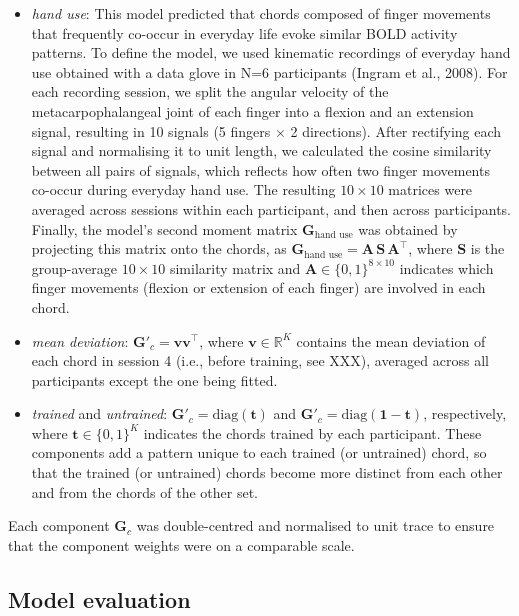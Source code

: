 \documentclass{article}
\begin{document}
\begin{itemize}
    \item \textit{hand use}: This model predicted that chords composed of finger movements that frequently co-occur in everyday life evoke similar BOLD activity patterns. To define the model, we used kinematic recordings of everyday hand use obtained with a data glove in N=6 participants (Ingram et al., 2008). For each recording session, we split the angular velocity of the metacarpophalangeal joint of each finger into a flexion and an extension signal, resulting in 10 signals (5 fingers $\times$ 2 directions). After rectifying each signal and normalising it to unit length, we calculated the cosine similarity between all pairs of signals, which reflects how often two finger movements co-occur during everyday hand use. The resulting $10 \times 10$ matrices were averaged across sessions within each participant, and then across participants. Finally, the model's second moment matrix $\mathbf{G}_{\text{hand use}}$ was obtained by projecting this matrix onto the chords, as $\mathbf{G}_{\text{hand use}} = \mathbf{A}\,\mathbf{S}\,\mathbf{A}^\top$, where $\mathbf{S}$ is the group-average $10 \times 10$ similarity matrix and $\mathbf{A} \in \{0,1\}^{8 \times 10}$ indicates which finger movements (flexion or extension of each finger) are involved in each chord.
    \item \textit{mean deviation}: $\mathbf{G}'_c = \mathbf{v}\mathbf{v}^\top$, where $\mathbf{v} \in \mathbb{R}^K$ contains the mean deviation of each chord in session 4 (i.e., before training, see XXX), averaged across all participants except the one being fitted.
    \item \textit{trained} and \textit{untrained}: $\mathbf{G}'_c = \mathrm{diag}(\mathbf{t})$ and $\mathbf{G}'_c = \mathrm{diag}(\mathbf{1} - \mathbf{t})$, respectively, where $\mathbf{t} \in \{0, 1\}^K$ indicates the chords trained by each participant. These components add a pattern unique to each trained (or untrained) chord, so that the trained (or untrained) chords become more distinct from each other and from the chords of the other set. \\
\end{itemize}

Each component $\mathbf{G}_c$ was double-centred and normalised to unit trace to ensure that the component weights were on a comparable scale. 

\subsection{Model evaluation}
\end{document}
